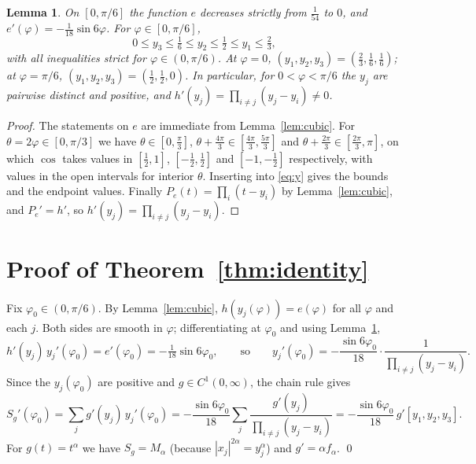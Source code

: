 \documentclass[11pt]{amsart}
\newtheorem{lemma}[theorem]{Lemma}
\theoremstyle{remark}
\begin{document}
\begin{lemma}\label{lem:roots}
On $[0,\pi/6]$ the function $e$ decreases strictly from $\frac1{54}$ to $0$, and
$e'(\varphi)=-\frac1{18}\sin 6\varphi$. For $\varphi\in[0,\pi/6]$,
\[
0\le y_3\le\tfrac16\le y_2\le\tfrac12\le y_1\le\tfrac23,
\]
with all inequalities strict for $\varphi\in(0,\pi/6)$. At $\varphi=0$,
$(y_1,y_2,y_3)=(\frac23,\frac16,\frac16)$; at $\varphi=\pi/6$,
$(y_1,y_2,y_3)=(\frac12,\frac12,0)$. In particular, for $0<\varphi<\pi/6$ the $y_j$ are
pairwise distinct and positive, and $h'(y_j)=\prod_{i\ne j}(y_j-y_i)\ne0$.
\end{lemma}

\begin{proof}
The statements on $e$ are immediate from Lemma~\ref{lem:cubic}. For
$\theta=2\varphi\in[0,\pi/3]$ we have $\theta\in[0,\frac\pi3]$,
$\theta+\frac{4\pi}3\in[\frac{4\pi}3,\frac{5\pi}3]$ and
$\theta+\frac{2\pi}3\in[\frac{2\pi}3,\pi]$, on which $\cos$ takes values in
$[\frac12,1]$, $[-\frac12,\frac12]$ and $[-1,-\frac12]$ respectively, with values in the
open intervals for interior $\theta$. Inserting into \eqref{eq:y} gives the bounds and the
endpoint values. Finally $P_e(t)=\prod_i(t-y_i)$ by Lemma~\ref{lem:cubic}, and
$P_e'=h'$, so $h'(y_j)=\prod_{i\ne j}(y_j-y_i)$.
\end{proof}

\section{\texorpdfstring{Proof of Theorem~\ref{thm:identity}}{Proof of Theorem}}

Fix $\varphi_0\in(0,\pi/6)$. By Lemma~\ref{lem:cubic}, $h(y_j(\varphi))=e(\varphi)$ for
all $\varphi$ and each $j$. Both sides are smooth in $\varphi$; differentiating at
$\varphi_0$ and using Lemma~\ref{lem:roots},
\[
h'(y_j)\,y_j'(\varphi_0)=e'(\varphi_0)=-\tfrac1{18}\sin6\varphi_0,\qquad\text{so}\qquad
y_j'(\varphi_0)=-\frac{\sin 6\varphi_0}{18}\cdot\frac1{\prod_{i\ne j}(y_j-y_i)} .
\]
Since the $y_j(\varphi_0)$ are positive and $g\in C^1(0,\infty)$, the chain rule gives
\[
S_g'(\varphi_0)=\sum_j g'(y_j)\,y_j'(\varphi_0)
=-\frac{\sin6\varphi_0}{18}\sum_j\frac{g'(y_j)}{\prod_{i\ne j}(y_j-y_i)}
=-\frac{\sin6\varphi_0}{18}\,g'[y_1,y_2,y_3].
\]
For $g(t)=t^\alpha$ we have $S_g=M_\alpha$ (because $|x_j|^{2\alpha}=y_j^{\alpha}$) and
$g'=\alpha f_\alpha$. \qed
\end{document}
